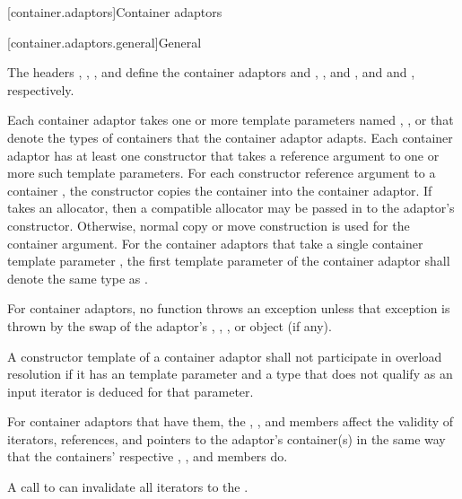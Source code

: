[container.adaptors]{Container adaptors}

[container.adaptors.general]{General}

\pnum
The headers
,
,
,
and 
define the container adaptors
 and ,
,
 and ,
and  and ,
respectively.

\pnum
Each container adaptor takes
one or more template parameters
named , , or 
that denote the types of containers that the container adaptor adapts.
Each container adaptor has at least one constructor
that takes a reference argument to one or more such template parameters.
For each constructor reference argument to a container ,
the constructor copies the container into the container adaptor.
If  takes an allocator, then a compatible allocator may be passed in
to the adaptor's constructor. Otherwise, normal copy or move construction is used for the container
argument.
For the container adaptors
that take a single container template parameter ,
the first template parameter  of the container adaptor
shall denote the same type as .

\pnum
For container adaptors, no  function throws an exception unless that
exception is thrown by the swap of the adaptor's
,
,
, or
 object (if any).

\pnum
A constructor template of a container adaptor
shall not participate in overload resolution
if it has an  template parameter and
a type that does not qualify as an input iterator is deduced for that parameter.

\pnum
For container adaptors that have them,
the , , and  members
affect the validity of iterators, references, and pointers
to the adaptor's container(s) in the same way that
the containers' respective
, , and  members do.
\begin{example}
A call to 
can invalidate all iterators to the .
\end{example}

